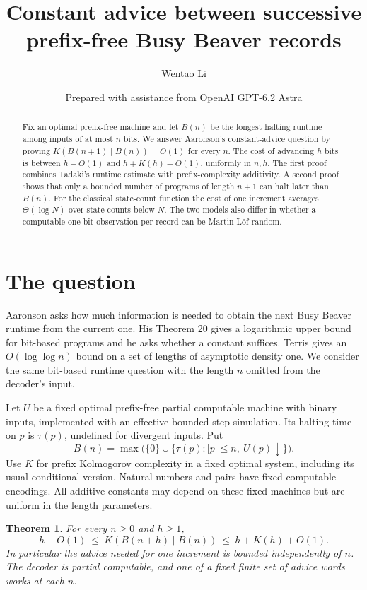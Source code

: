 \documentclass[11pt]{article}
\title{Constant advice between successive\\prefix-free Busy Beaver records}
\author{Wentao Li}
\date{Prepared with assistance from OpenAI GPT-6.2 Astra}
\newtheorem{theorem}{Theorem}
\newcommand{\BB}{B}
\begin{document}
\maketitle
\begin{abstract}
Fix an optimal prefix-free machine and let $B(n)$ be the longest halting runtime among inputs of at most $n$ bits. We answer Aaronson's constant-advice question by proving $K(B(n+1)\mid B(n))=O(1)$ for every $n$. The cost of advancing $h$ bits is between $h-O(1)$ and $h+K(h)+O(1)$, uniformly in $n,h$. The first proof combines Tadaki's runtime estimate with prefix-complexity additivity. A second proof shows that only a bounded number of programs of length $n+1$ can halt later than $B(n)$. For the classical state-count function the cost of one increment averages $\Theta(\log N)$ over state counts below $N$. The two models also differ in whether a computable one-bit observation per record can be Martin-L\"of random.
\end{abstract}

\section*{The question}
Aaronson \cite[Section 5.5, after Theorem 21]{aaronson} asks how much information is needed to obtain the next Busy Beaver runtime from the current one. His Theorem 20 gives a logarithmic upper bound for bit-based programs and he asks whether a constant suffices. Terris \cite{terris} gives an $O(\log\log n)$ bound on a set of lengths of asymptotic density one. We consider the same bit-based runtime question with the length $n$ omitted from the decoder's input.

Let $U$ be a fixed optimal prefix-free partial computable machine with binary inputs, implemented with an effective bounded-step simulation. Its halting time on $p$ is $\tau(p)$, undefined for divergent inputs. Put
\[
 \BB(n)=\max\bigl(\{0\}\cup\{\tau(p): |p|\le n,\ U(p)\downarrow\}\bigr).
\]
Use $K$ for prefix Kolmogorov complexity in a fixed optimal system, including its usual conditional version. Natural numbers and pairs have fixed computable encodings. All additive constants may depend on these fixed machines but are uniform in the length parameters.

\begin{theorem}\label{gap}
For every $n\ge0$ and $h\ge1$,
\[
 h-O(1)\ \le\ K(\BB(n+h)\mid\BB(n))\ \le\ h+K(h)+O(1).
\]
In particular the advice needed for one increment is bounded independently of $n$. The decoder is partial computable, and one of a fixed finite set of advice words works at each $n$.
\end{theorem}
\end{document}
